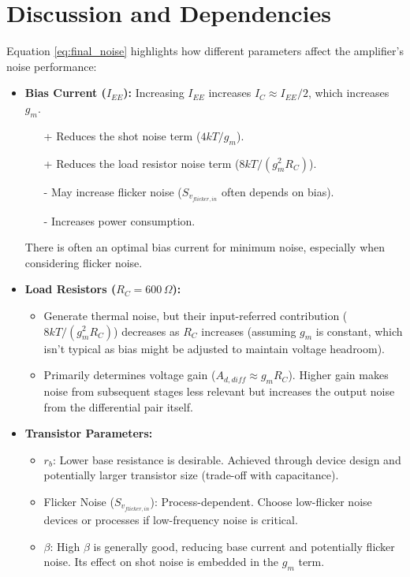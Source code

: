\documentclass[11pt]{article}
\begin{document}
\section{Discussion and Dependencies}

Equation \eqref{eq:final_noise} highlights how different parameters affect the amplifier's noise performance:

\begin{itemize}
    \item \textbf{Bias Current ($I_{EE}$):} Increasing $I_{EE}$ increases $I_C \approx I_{EE}/2$, which increases $g_m$.
        \begin{itemize}
            \item [+] Reduces the shot noise term ($4kT/g_m$).
            \item [+] Reduces the load resistor noise term ($8kT/(g_m^2 R_C)$).
            \item [-] May increase flicker noise ($S_{v_{flicker,in}}$ often depends on bias).
            \item [-] Increases power consumption.
        \end{itemize}
    There is often an optimal bias current for minimum noise, especially when considering flicker noise.

    \item \textbf{Load Resistors ($R_C = 600\,\Omega$):}
        \begin{itemize}
            \item Generate thermal noise, but their input-referred contribution ($8kT/(g_m^2 R_C)$) decreases as $R_C$ increases (assuming $g_m$ is constant, which isn't typical as bias might be adjusted to maintain voltage headroom).
            \item Primarily determines voltage gain ($A_{d,diff} \approx g_m R_C$). Higher gain makes noise from subsequent stages less relevant but increases the output noise from the differential pair itself.
        \end{itemize}

    \item \textbf{Transistor Parameters:}
        \begin{itemize}
            \item $r_b$: Lower base resistance is desirable. Achieved through device design and potentially larger transistor size (trade-off with capacitance).
            \item Flicker Noise ($S_{v_{flicker,in}}$): Process-dependent. Choose low-flicker noise devices or processes if low-frequency noise is critical.
            \item $\beta$: High $\beta$ is generally good, reducing base current and potentially flicker noise. Its effect on shot noise is embedded in the $g_m$ term.
        \end{itemize}


\end{itemize}
\end{document}
